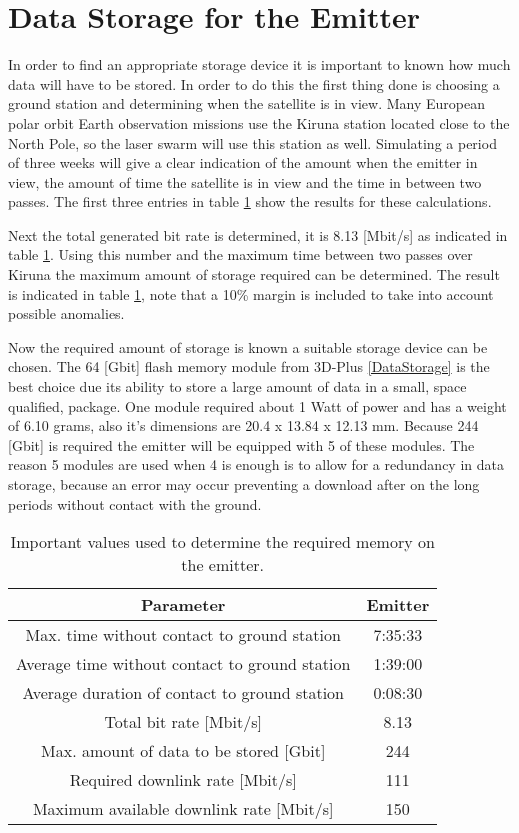 \section{Data Storage for the Emitter}
\label{DSEmitter}

In order to find an appropriate storage device it is important to known how much data will have to be stored. In order to do this the first thing done is choosing a ground station and determining when the satellite is in view. Many European polar orbit Earth observation missions use the Kiruna station located close to the North Pole, so the laser swarm will use this station as well. Simulating a period of three weeks will give a clear indication of the amount when the emitter in view, the amount of time the satellite is in view and the time in between two passes. The first three entries in table \ref{DSEmitterTable} show the results for these calculations.

Next the total generated bit rate is determined, it is 8.13 [Mbit/s] as indicated in table \ref{DSEmitterTable}. Using this number and the maximum time between two passes over Kiruna the maximum amount of storage required can be determined. The result is indicated in table \ref{DSEmitterTable}, note that a 10\% margin is included to take into account possible anomalies. 

Now the required amount of storage is known a suitable storage device can be chosen. The 64 [Gbit] flash memory module from 3D-Plus \ref{DataStorage} is the best choice due its ability to store a large amount of data in a small, space qualified, package. One module required about 1 Watt of power and has a weight of 6.10 grams, also it's dimensions are 20.4 x 13.84 x 12.13 mm. Because 244 [Gbit] is required the emitter will be equipped with 5 of these modules. The reason 5 modules are used when 4 is enough is to allow for a redundancy in data storage, because an error may occur preventing a download after on the long periods without contact with the ground.

\begin{table}
\centering
\begin{tabular}{c|c}
\textbf{Parameter}  & \textbf{Emitter} \\\hline\hline
	Max. time without contact to ground station & 7:35:33 \\
	Average time without contact to ground station & 1:39:00  \\
	Average duration of contact to ground station & 0:08:30 \\
	Total bit rate [Mbit/s] & 8.13 \\
	Max. amount of data to be stored [Gbit] & 244 \\
	Required downlink rate [Mbit/s] & 111 \\
	Maximum available downlink rate [Mbit/s] & 150 \\
\end{tabular}
\caption{Important values used to determine the required memory on the emitter.}
\label{DSEmitterTable}
\end{table}

